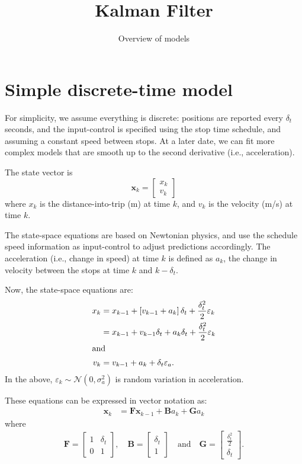 \documentclass[11pt]{article}
\title{Kalman Filter}
\author{Overview of models}
\date{}
\begin{document}
\maketitle



\section{Simple discrete-time model}

For simplicity, we assume everything is discrete: positions are reported every $\delta_t$
seconds, and the input-control is specified using the stop time schedule, and assuming a
constant speed between stops. At a later date, we can fit more complex models that are
smooth up to the second derivative (i.e., acceleration).

The state vector is
\begin{equation}
  \label{eq:state-vector}
  \mathbf{x}_k =
  \begin{bmatrix}
    x_k \\ v_k
  \end{bmatrix}
\end{equation}
where $x_k$ is the distance-into-trip (m) at time $k$, and $v_k$ is the velocity (m/s) at
time $k$.

The state-space equations are based on Newtonian physics, and use the schedule speed
information as input-control to adjust predictions accordingly.  The acceleration (i.e.,
change in speed) at time $k$ is defined as $a_k$, the change in velocity between the stops at
time $k$ and $k-\delta_t$.

Now, the state-space equations are:
\begin{align}
  \label{eq:state_space_eqns}
  x_k &= x_{k-1} + \left[v_{k-1} + a_k\right] \delta_t + \frac{\delta_t^2}{2} \varepsilon_k \\
  &= x_{k-1} + v_{k-1} \delta_t + a_k \delta_t + \frac{\delta_t^2}{2} \varepsilon_k \\
  \intertext{and}
  v_k &= v_{k-1} + a_k + \delta_t \varepsilon_a.
\end{align}
In the above, $\varepsilon_k \sim \mathcal{N}\left(0,\sigma_a^2\right)$ is random
variation in acceleration.

These equations can be expressed in vector notation as:
\begin{align}
  \label{eq:state_matrix_eqns}
  \mathbf{x}_k &= \mathbf{F} \mathbf{x}_{k-1} + \mathbf{B} a_k + \mathbf{G} a_k
\end{align}
where
\begin{align}
  \mathbf{F} =
  \begin{bmatrix}
    1 & \delta_t \\
    0 & 1
  \end{bmatrix},
  \quad
  \mathbf{B} =
  \begin{bmatrix}
    \delta_t \\ 1
  \end{bmatrix}
  \quad\text{and}\quad
  \mathbf{G} =
  \begin{bmatrix}
    \frac{\delta_t^2}{2} \\ \delta_t
  \end{bmatrix}.
\end{align}
\end{document}
